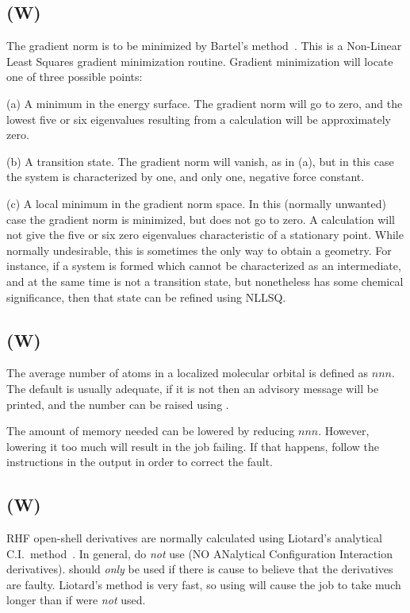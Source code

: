 \subsection*{ (W)}
        The gradient norm is to be minimized by Bartel's method~\cite{nllsq}.
This is  a
   Non-Linear   Least   Squares  gradient  minimization  routine.   Gradient
   minimization will locate one of three possible points:

        (a) A minimum in the energy surface.  The gradient norm will  go  to
   zero,  and  the  lowest  five  or  six eigenvalues resulting from a 
   calculation will be approximately zero.

        (b) A transition state.  The gradient norm will vanish, as  in  (a),
   but  in  this  case  the  system  is  characterized by one, and only one,
   negative force constant.

        (c) A local minimum in the gradient norm space.  In  this  (normally
   unwanted)  case  the gradient norm is minimized, but does not go to zero.
   A  calculation will not  give  the  five  or  six  zero  eigenvalues
   characteristic  of  a stationary point.  While normally undesirable, this
   is sometimes the only way to obtain  a  geometry.   For  instance,  if  a
   system is formed which cannot be characterized as an intermediate, and at
   the same time is  not  a  transition  state,  but  nonetheless  has  some
   chemical significance, then that state can be refined using NLLSQ.

\subsection*{ (W)}
The average number of atoms in a localized molecular orbital is defined as
$nnn$.  The default is usually adequate, if it is not then an advisory message
will be printed, and the number can be raised using .

The amount of memory needed can be lowered by reducing $nnn$.  However,
lowering it too much will result in the job failing.  If that happens,
follow the instructions in the output in order to correct the fault.

\subsection*{ (W)}
           RHF open-shell derivatives are normally calculated  using  Liotard's
   analytical C.I.\ method~\cite{analci}.
In general, do {\em not} use 
   (NO ANalytical Configuration Interaction derivatives).
   should {\em only}
be used if there is cause to believe that the derivatives are faulty.
Liotard's method is very fast, so using  will cause the job to
take much longer than if  were {\em not} used.

